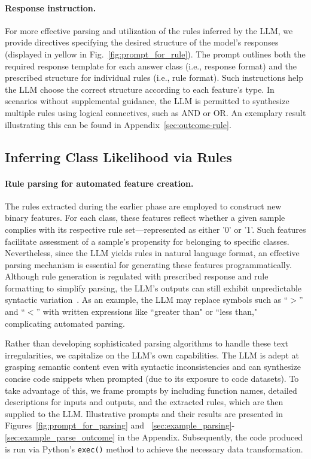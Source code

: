 \vspace*{-0.12in}
\paragraph{Response instruction.} For more effective parsing and utilization of the rules inferred by the LLM, we provide directives specifying the desired structure of the model's responses (displayed in yellow in Fig.~\ref{fig:prompt_for_rule}). The prompt outlines both the required response template for each answer class (i.e., response format) and the prescribed structure for individual rules (i.e., rule format). Such instructions help the LLM choose the correct structure according to each feature's type. In scenarios without supplemental guidance, the LLM is permitted to synthesize multiple rules using logical connectives, such as AND or OR. An exemplary result illustrating this can be found in Appendix~\ref{sec:outcome-rule}.

\subsection{Inferring Class Likelihood via Rules}
\label{Sec:training}

\paragraph{Rule parsing for automated feature creation.} The rules extracted during the earlier phase are employed to construct new binary features. For each class, these features reflect whether a given sample complies with its respective rule set—represented as either '0' or '1'. Such features facilitate assessment of a sample's propensity for belonging to specific classes. Nevertheless, since the LLM yields rules in natural language format, an effective parsing mechanism is essential for generating these features programmatically. Although rule generation is regulated with prescribed response and rule formatting to simplify parsing, the LLM's outputs can still exhibit unpredictable syntactic variation~\cite{kovavc2023large}. As an example, the LLM may replace symbols such as ``$>$” and ``$<$” with written expressions like ``greater than" or ``less than," complicating automated parsing.

Rather than developing sophisticated parsing algorithms to handle these text irregularities, we capitalize on the LLM’s own capabilities. The LLM is adept at grasping semantic content even with syntactic inconsistencies and can synthesize concise code snippets when prompted (due to its exposure to code datasets). To take advantage of this, we frame prompts by including function names, detailed descriptions for inputs and outputs, and the extracted rules, which are then supplied to the LLM. Illustrative prompts and their results are presented in Figures~\ref{fig:prompt_for_parsing} and ~\ref{sec:example_parsing}-\ref{sec:example_parse_outcome} in the Appendix. Subsequently, the code produced is run via Python’s \texttt{exec()} method to achieve the necessary data transformation.

